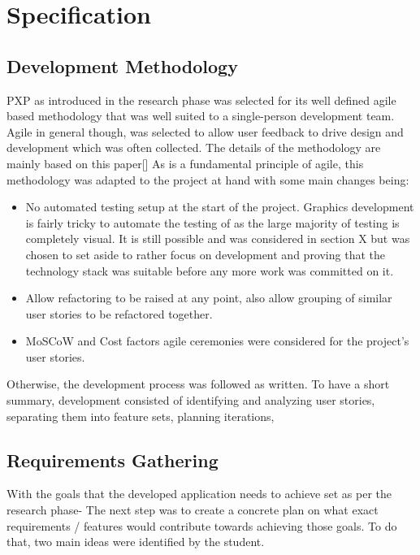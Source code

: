 \section{Specification}

\subsection{Development Methodology}
PXP as introduced in the research phase was selected for its well defined agile based methodology that was well suited to a single-person development team. Agile in general though, was selected to allow user feedback to drive design and development which was often collected. The details of the methodology are mainly based on this paper[]
As is a fundamental principle of agile, this methodology was adapted to the project at hand with some main changes being:
\begin{itemize}
    \item No automated testing setup at the start of the project. Graphics development is fairly tricky to automate the testing of as the large majority of testing is completely visual. It is still possible and was considered in section X but was chosen to set aside to rather focus on development and proving that the technology stack was suitable before any more work was committed on it.
    \item Allow refactoring to be raised at any point, also allow grouping of similar user stories to be refactored together.
    \item MoSCoW and Cost factors agile ceremonies were considered for the project’s user stories.
\end{itemize}

Otherwise, the development process was followed as written. To have a short summary, development consisted of identifying and analyzing user stories, separating them into feature sets, planning iterations,

\subsection{Requirements Gathering}
With the goals that the developed application needs to achieve set as per the research phase- The next step was to create a concrete plan on what exact requirements / features would contribute towards achieving those goals. To do that, two main ideas were identified by the student.

